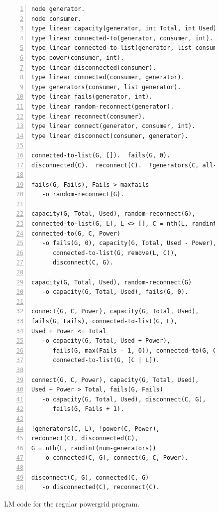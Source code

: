 \begin{figure}[h!]
\begin{Verbatim}[numbers=left,fontsize=\scriptsize,commandchars=*\#\&]
node generator.
node consumer.
type linear capacity(generator, int Total, int Used).
type linear connected-to(generator, consumer, int).
type linear connected-to-list(generator, list consumer).
type power(consumer, int).
type linear disconnected(consumer).
type linear connected(consumer, generator).
type generators(consumer, list generator).
type linear fails(generator, int).
type linear random-reconnect(generator).
type linear reconnect(consumer).
type linear connect(generator, consumer, int).
type linear disconnect(consumer, generator).

connected-to-list(G, []).  fails(G, 0).
disconnected(C).  reconnect(C).  !generators(C, all-generators).

fails(G, Fails), Fails > maxfails
   -o random-reconnect(G).

capacity(G, Total, Used), random-reconnect(G),
connected-to-list(G, L), L <> [], C = nth(L, randint(length(L))),
connected-to(G, C, Power)
   -o fails(G, 0), capacity(G, Total, Used - Power),
      connected-to-list(G, remove(L, C)),
      disconnect(C, G).

capacity(G, Total, Used), random-reconnect(G)
   -o capacity(G, Total, Used), fails(G, 0).

connect(G, C, Power), capacity(G, Total, Used),
fails(G, Fails), connected-to-list(G, L),
Used + Power <= Total
   -o capacity(G, Total, Used + Power),
      fails(G, max(Fails - 1, 0)), connected-to(G, C, Power),
      connected-to-list(G, [C | L]).

connect(G, C, Power), capacity(G, Total, Used),
Used + Power > Total, fails(G, Fails)
   -o capacity(G, Total, Used), disconnect(C, G),
      fails(G, Fails + 1).

!generators(C, L), !power(C, Power),
reconnect(C), disconnected(C),
G = nth(L, randint(num-generators))
   -o connected(C, G), connect(G, C, Power).

disconnect(C, G), connected(C, G)
   -o disconnected(C), reconnect(C).
\end{Verbatim}
\caption{LM code for the regular powergrid program.}
\label{code:threads:powergrid}
\end{figure}

